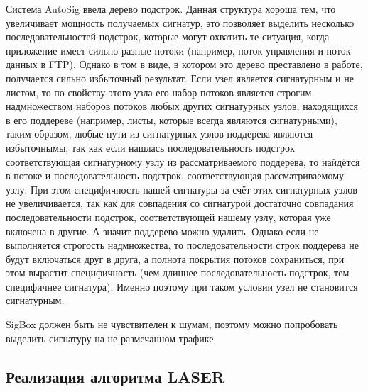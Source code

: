 Система AutoSig ввела дерево подстрок.
Данная структура хороша тем, что увеличивает мощность получаемых сигнатур,
это позволяет выделить несколько последовательностей подстрок, которые могут охватить те ситуация, когда
приложение имеет сильно разные потоки (например, поток управления и поток данных в FTP).
Однако в том в виде, в котором это дерево преставлено в работе, получается сильно избыточный результат.
Если узел является сигнатурным и не листом, то по свойству этого узла его набор потоков является строгим надмножеством
наборов потоков любых других сигнатурных узлов, находящихся в его поддереве (например, листы, которые всегда являются сигнатурными),
таким образом, любые пути из сигнатурных узлов поддерева являются избыточнымы, так как если нашлась последовательность подстрок
соответствующая сигнатурному узлу из рассматриваемого поддерева, то найдётся в потоке и последовательность подстрок, соответствующая рассматриваемому узлу.
При этом специфичность нашей сигнатуры за счёт этих сигнатурных узлов не увеличивается,
так как для совпадения со сигнатурой достаточно совпадания последовательности подстрок, соответствующей нашему узлу, которая уже включена в другие.
А значит поддерево можно удалить. Однако если не выполняется строгость надмножества, то последовательности строк
поддерева не будут включаться друг в друга, а полнота покрытия потоков сохраниться,
при этом вырастит специфичность (чем длиннее последовательность подстрок, тем специфичнее сигнатура).
Именно поэтому при таком условии узел не становится сигнатурным.

SigBox должен быть не чувствителен к шумам, поэтому можно попробовать выделить сигнатуру на не размечанном трафике.

\subsection{Реализация алгоритма LASER}



\newpage
